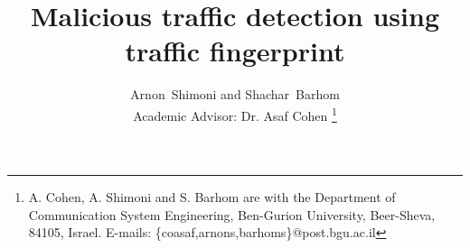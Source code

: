 \documentclass[13pt,journal,compsoc,onecolumn]{IEEEtran}
\begin{document}
%
\title{Malicious traffic detection using traffic fingerprint}
%
%
%
%

\author{Arnon~Shimoni and
        Shachar~Barhom
        
        Academic Advisor: Dr. Asaf Cohen%
\thanks{A. Cohen, A. Shimoni and S. Barhom are with the Department of Communication System Engineering, Ben-Gurion University, Beer-Sheva, 84105, Israel. E-mails: \{coasaf,arnons,barhoms\}@post.bgu.ac.il}}
\end{document}
